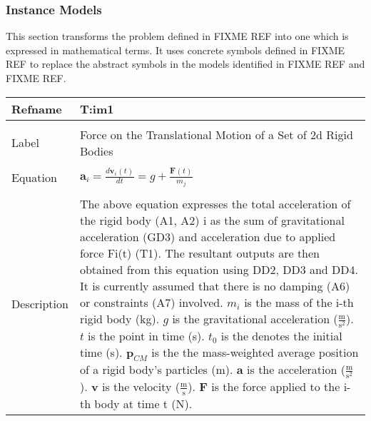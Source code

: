 \documentclass[12pt]{article}
\begin{document}
\subsubsection{Instance Models}
\label{Sec:IMs}
This section transforms the problem defined in FIXME REF into one which is expressed in mathematical terms. It uses concrete symbols defined in FIXME REF to replace the abstract symbols in the models identified in FIXME REF and FIXME REF.
~\newline
\noindent \begin{minipage}{\textwidth}
\begin{tabular}{p{} p{}}
\toprule \textbf{Refname} & \textbf{T:im1}
\label{T:im1}
\\ \midrule \\
Label & Force on the Translational Motion of a Set of 2d Rigid Bodies
\\ \midrule \\
Equation & ${\mathbf{a}_{i}}=\frac{d {\mathbf{v}_{i}}\left(t\right)}{d t}=g+\frac{\mathbf{F}\left(t\right)}{{m_{j}}}$
\\ \midrule \\
Description & The above equation expresses the total acceleration of the rigid body (A1, A2) i as the sum of gravitational acceleration (GD3) and acceleration due to applied force Fi(t) (T1). The resultant outputs are then obtained from this equation using DD2, DD3 and DD4. It is currently assumed that there is no damping (A6) or constraints (A7) involved. ${m_{i}}$ is the mass of the i-th rigid body (kg). $g$ is the gravitational acceleration ($\frac{\text{m}}{\text{s}^{2}}$). $t$ is the point in time (s). ${t_{0}}$ is the denotes the initial time (s). ${\mathbf{p}_{CM}}$ is the the mass-weighted average position of a rigid body's particles (m). $\mathbf{a}$ is the acceleration ($\frac{\text{m}}{\text{s}^{2}}$). $\mathbf{v}$ is the velocity ($\frac{\text{m}}{\text{s}}$). $\mathbf{F}$ is the force applied to the i-th body at time t (N).
\\ \bottomrule \end{tabular}
\end{minipage}\\
~\newline
\end{document}
